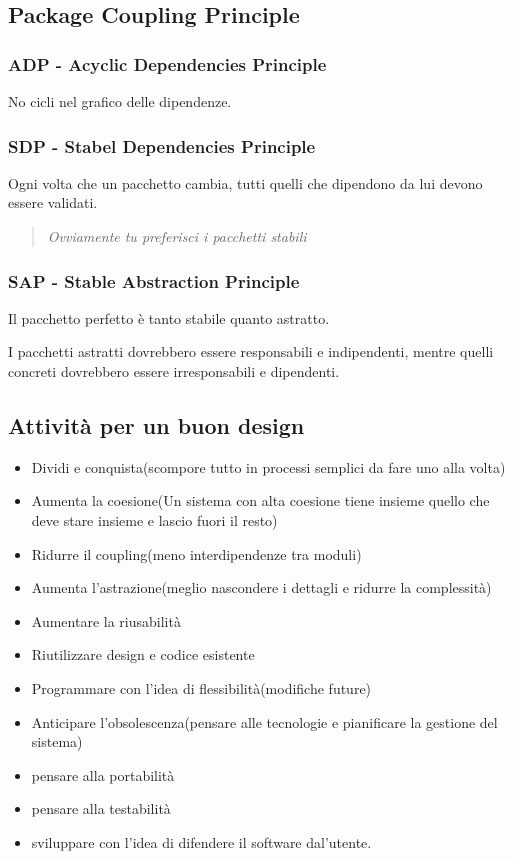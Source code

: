 \documentclass{article}
\begin{document}
\subsection{Package Coupling Principle}
\subsubsection{ADP - Acyclic Dependencies Principle}
No cicli nel grafico delle dipendenze.

\subsubsection{SDP - Stabel Dependencies Principle}
Ogni volta che un pacchetto cambia, tutti quelli che dipendono da lui devono 
essere validati.

\begin{quotation}
    \textit{
        Ovviamente tu preferisci i pacchetti stabili
    }
\end{quotation}

\subsubsection{SAP - Stable Abstraction Principle}
Il pacchetto perfetto è tanto stabile quanto astratto.

I pacchetti astratti dovrebbero essere responsabili e indipendenti, mentre 
quelli concreti dovrebbero essere irresponsabili e dipendenti.

\subsection{Attività per un buon design}
\begin{itemize}
    \item Dividi e conquista(scompore tutto in processi semplici da fare uno alla volta)
    \item Aumenta la coesione(Un sistema con alta coesione tiene insieme quello che deve stare insieme e lascio fuori il resto)
    \item Ridurre il coupling(meno interdipendenze tra moduli)
    \item Aumenta l'astrazione(meglio nascondere i dettagli e ridurre la complessità)
    \item Aumentare la riusabilità
    \item Riutilizzare design e codice esistente
    \item Programmare con l'idea di flessibilità(modifiche future)
    \item Anticipare l'obsolescenza(pensare alle tecnologie e pianificare la gestione del sistema)
    \item pensare alla portabilità
    \item pensare alla testabilità
    \item sviluppare con l'idea di difendere il software dal'utente.
\end{itemize}
\end{document}
